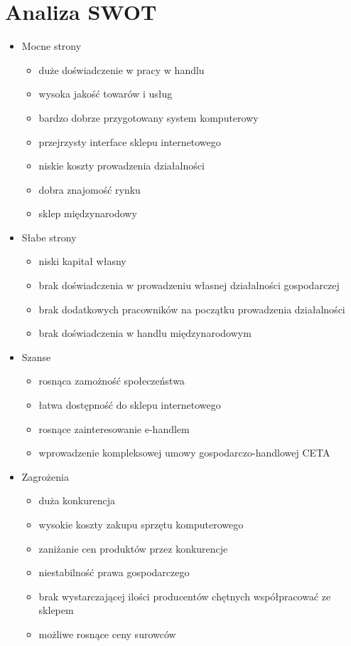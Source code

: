 \section{Analiza SWOT}
	\begin{itemize}	
		\item Mocne strony
			\begin{itemize}
				\item duże doświadczenie w pracy w handlu
				\item wysoka jakość towarów i usług
				\item bardzo dobrze przygotowany system komputerowy
				\item przejrzysty interface sklepu internetowego
				\item niskie koszty prowadzenia działalności
				\item dobra znajomość rynku
				\item sklep międzynarodowy
			\end{itemize}
			
		\item Słabe strony
			\begin{itemize}
				\item niski kapitał własny
				\item brak doświadczenia w prowadzeniu własnej działalności gospodarczej
				\item brak dodatkowych pracowników na początku prowadzenia działalności
				\item brak doświadczenia w handlu międzynarodowym
			\end{itemize}
			
		\item Szanse
			\begin{itemize}
				\item rosnąca zamożność społeczeństwa
				\item łatwa dostępność do sklepu internetowego
				\item rosnące zainteresowanie e-handlem
				\item wprowadzenie kompleksowej umowy gospodarczo-handlowej CETA
			\end{itemize}
			
		\item Zagrożenia
			\begin{itemize}
				\item duża konkurencja
				\item wysokie koszty zakupu sprzętu komputerowego
				\item zaniżanie cen produktów przez konkurencje
				\item niestabilność prawa gospodarczego
				\item brak wystarczającej ilości producentów chętnych współpracować ze sklepem
				\item możliwe rosnące ceny surowców
			\end{itemize}
	\end{itemize}
